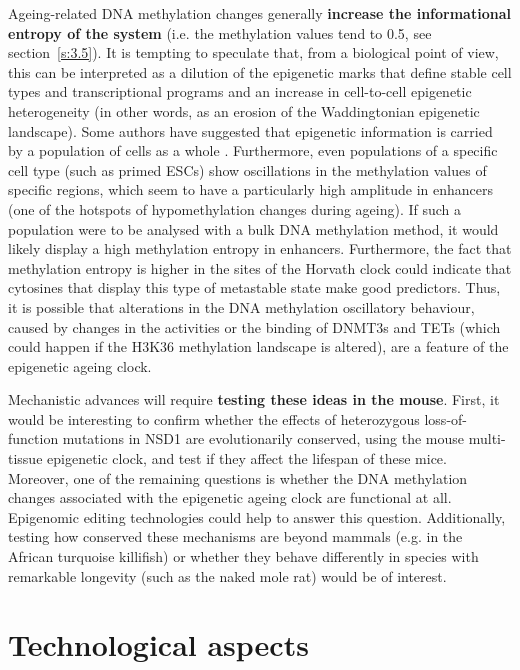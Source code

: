 Ageing-related DNA methylation changes generally \textbf{increase the informational entropy of the system} (i.e. the methylation values tend to 0.5, see section~\ref{s:3.5}). It is tempting to speculate that, from a biological point of view, this can be interpreted as a dilution of the epigenetic marks that define stable cell types and transcriptional programs and an increase in cell-to-cell epigenetic heterogeneity (in other words, as an erosion of the Waddingtonian epigenetic landscape). Some authors have suggested that epigenetic information is carried by a population of cells as a whole \citep{Jenkinson2017,Shipony2014}. Furthermore, even populations of a specific cell type (such as primed \acrshort{ESCs}) show oscillations in the methylation values of specific regions, which seem to have a particularly high amplitude in enhancers \citep{Rulands2018} (one of the hotspots of hypomethylation changes during ageing). If such a population were to be analysed with a bulk DNA methylation method, it would likely display a high methylation entropy in enhancers. Furthermore, the fact that methylation entropy is higher in the sites of the Horvath clock could indicate that cytosines that display this type of metastable state make good predictors. Thus, it is possible that alterations in the DNA methylation oscillatory behaviour, caused by changes in the activities or the binding of DNMT3s and TETs (which could happen if the H3K36 methylation landscape is altered), are a feature of the epigenetic ageing clock.

\bigskip

Mechanistic advances will require \textbf{testing these ideas in the mouse}. First, it would be interesting to confirm whether the effects of heterozygous loss-of-function mutations in NSD1 are evolutionarily conserved, using the mouse multi-tissue epigenetic clock, and test if they affect the lifespan of these mice. Moreover, one of the remaining questions is whether the DNA methylation changes associated with the epigenetic ageing clock are functional at all. Epigenomic editing technologies \citep{Liu2016a} could help to answer this question. Additionally, testing how conserved these mechanisms are beyond mammals (e.g. in the African turquoise killifish) or whether they behave differently in species with remarkable longevity (such as the naked mole rat) would be of interest. 

\smallskip

\section{Technological aspects}


